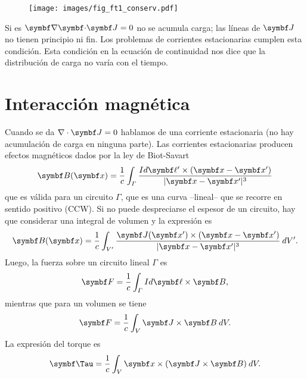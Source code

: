 \documentclass[10pt,oneside]{CBFT_book}
\begin{document}
\begin{figure}[htb]
	\begin{center}
	\texttt{[image: images/fig\_ft1\_conserv.pdf]}	 
	\end{center}
	\caption{}
	\label{conserv_carga}
\end{figure} 

Si es $\divem{J}=0$ no se acumula carga; las líneas de $\vb{J}$ no tienen principio ni fin.
Los problemas de corrientes estacionarias cumplen esta condición. Esta condición en la ecuación de continuidad
nos dice que la distribución de carga no varía con el tiempo.

\section{Interacción magnética}

Cuando se da $\nabla \cdot \vb{J}=0$ hablamos de una corriente estacionaria (no hay acumulación de carga en
ninguna parte). Las corrientes estacionarias producen efectos magnéticos dados por la ley de Biot-Savart
\[
	\vb{B}(\vb{x}) = \frac{1}{c} \int_\Gamma \frac{I d\vb{\ell}' \times (\vb{x} - \vb{x}')}{|\vb{x} - \vb{x}'|^3} 
\]
que es válida para un circuito $\Gamma$, que es una curva --lineal-- que se recorre en sentido positivo (CCW).
Si no puede despreciarse el espesor de un circuito, hay que considerar una integral de volumen y la expresión es 
\[
	\vb{B}(\vb{x}) = 
	\frac{1}{c} \int_{V'} \frac{ \vb{J}(\vb{x}') \times (\vb{x} - \vb{x}')}{|\vb{x} - \vb{x}'|^3} \: dV'.
\]
Luego, la fuerza sobre un circuito lineal $\Gamma$ es
\[
	\vb{F} = \frac{1}{c} \int_\Gamma I d \vb{\ell} \times \vb{B},
\]
mientras que para un volumen se tiene
\[
	\vb{F} = \frac{1}{c} \int_V \vb{J} \times \vb{B} \: dV.
\]
La expresión del torque es
\[
	\vb{\Tau} = \frac{1}{c} \int_V \vb{x} \times (\vb{J} \times \vb{B}) \: dV.
\]
\end{document}
